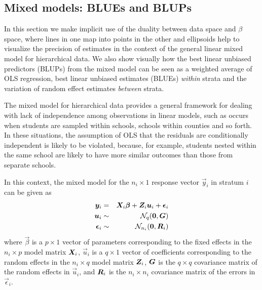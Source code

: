 \subsection{Mixed models: BLUEs and BLUPs}

In this section we make implicit use of the duality between data space and $\beta$
space, where lines in one map into points in the other and ellipsoids help to
visualize the precision of estimates in the context of the general linear mixed
model for hierarchical data.  We also show visually how the best linear unbiased
predictors (BLUPs) from the mixed model can be seen as a weighted average
of OLS regression, best linear unbiased estimates (BLUEs) \emph{within} strata
and the variation of random effect estimates \emph{between} strata.

The mixed model for hierarchical data provides a general framework for 
dealing with lack of independence among observations in linear models,
such as occurs when students are sampled within schools, schools within
counties and so forth. In these situations, the assumption of OLS that
the residuals are conditionally independent is likely to be violated,
because, for example, students nested within the same school are 
likely to have more similar outcomes than those from separate schools.

In this context, the mixed model for the $n_i \times 1$ response vector $\vec{y}_i$ in
stratum $i$ can be given as 
\begin{eqnarray}
 \bm{y}_i & = & \bm{X}_i \bm{\beta} + \bm{Z}_i \bm{u}_i + \bm{\epsilon}_i \label{eq:mixed1} \\
 \bm{u}_i & \sim & \mathcal{N}_q (\bm{0}, \bm{G}) \nonumber\\
 \bm{\epsilon}_i & \sim & \mathcal{N}_{n_i} (\bm{0}, \bm{R}_i) \nonumber 
\end{eqnarray}
where 
$\vec{\beta}$ is a $p \times 1$ vector of parameters corresponding to the fixed effects
in the $n_i \times p$ model matrix $\bm{X}_i$,
$\vec{u}_i$ is a $q \times 1$ vector of coefficients corresponding to the random effects
in the $n_i \times q$ model matrix $\bm{Z}_i$,
$\bm{G}$ is the $q \times q$ covariance matrix of the random effects in $\vec{u}_i$,
and $\bm{R}_i$ is the $n_i \times n_i$ covariance matrix of the errors in $\vec{\epsilon}_i$.

